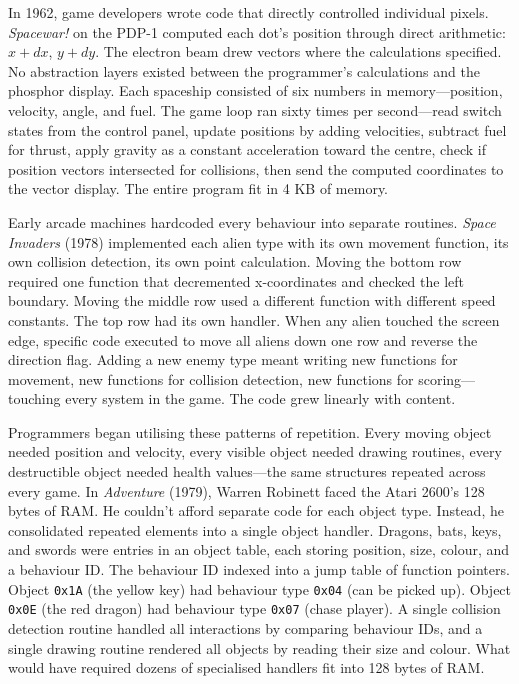 In 1962, game developers wrote code that directly controlled individual pixels. \emph{Spacewar!} on the PDP-1 computed each dot's position through direct arithmetic: $x + dx$, $y + dy$. The electron beam drew vectors where the calculations specified. No abstraction layers existed between the programmer's calculations and the phosphor display. Each spaceship consisted of six numbers in memory—position, velocity, angle, and fuel. The game loop ran sixty times per second—read switch states from the control panel, update positions by adding velocities, subtract fuel for thrust, apply gravity as a constant acceleration toward the centre, check if position vectors intersected for collisions, then send the computed coordinates to the vector display. The entire program fit in 4 KB of memory.

Early arcade machines hardcoded every behaviour into separate routines. \emph{Space Invaders} (1978) implemented each alien type with its own movement function, its own collision detection, its own point calculation. Moving the bottom row required one function that decremented x-coordinates and checked the left boundary. Moving the middle row used a different function with different speed constants. The top row had its own handler. When any alien touched the screen edge, specific code executed to move all aliens down one row and reverse the direction flag. Adding a new enemy type meant writing new functions for movement, new functions for collision detection, new functions for scoring—touching every system in the game. The code grew linearly with content.

Programmers began utilising these patterns of repetition. Every moving object needed position and velocity, every visible object needed drawing routines, every destructible object needed health values—the same structures repeated across every game. In \emph{Adventure} (1979), Warren Robinett faced the Atari 2600's 128 bytes of RAM. He couldn't afford separate code for each object type. Instead, he consolidated repeated elements into a single object handler. Dragons, bats, keys, and swords were entries in an object table, each storing position, size, colour, and a behaviour ID. The behaviour ID indexed into a jump table of function pointers. Object \texttt{0x1A} (the yellow key) had behaviour type \texttt{0x04} (can be picked up). Object \texttt{0x0E} (the red dragon) had behaviour type \texttt{0x07} (chase player). A single collision detection routine handled all interactions by comparing behaviour IDs, and a single drawing routine rendered all objects by reading their size and colour. What would have required dozens of specialised handlers fit into 128 bytes of RAM.

